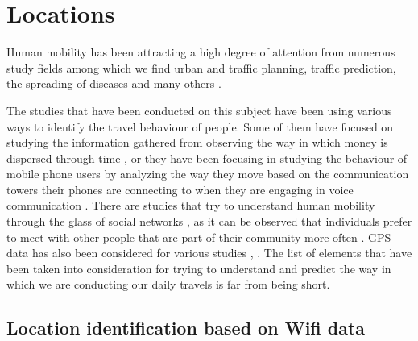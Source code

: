 \chapter{Locations}
\label{locations}
Human mobility has been attracting a high degree of attention from numerous
study fields among which we find urban and traffic planning, traffic prediction,
the spreading of diseases and many others \cite{AsgariGB13} \cite{Brockmann08}.

The studies that have been conducted on this subject have been using various
ways to identify the travel behaviour of people. Some of them have focused on
studying the information gathered from observing the way in which money is
dispersed through time \cite{Brockmann06}, or they have been focusing in
studying the behaviour of mobile phone users by analyzing the way they move
based on the communication towers their phones are connecting to when they are
engaging in voice communication \cite{Barabasi08}. There are studies that try to
understand human mobility through the glass of social networks
\cite{yang2010using}, as it can be observed that individuals prefer to meet with
other people that are part of their community more often
\cite{Musolesi:2007:DMM:1317425.1317433}. GPS data has also been considered for
various studies \cite{cuttone2014inferring}, \cite{5657695}. The list of
elements that have been taken into consideration for trying to understand and
predict the way in which we are conducting our daily travels is far from being
short. 

\section{Location identification based on Wifi data}
 
